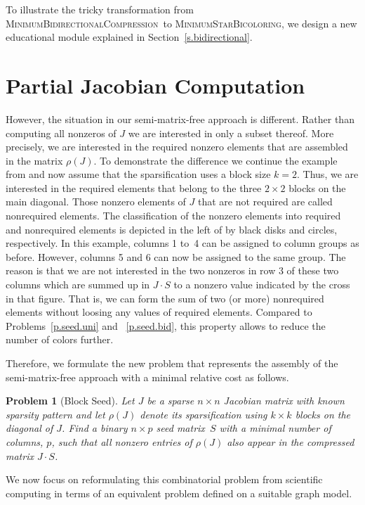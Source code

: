 \documentclass[12pt, oneside]{book}
\newtheorem{problem}{Problem}
\newcommand{\sparsifysymbol}{\ensuremath{\rho}}
\newcommand{\sparsify}[1]{\ensuremath{\sparsifysymbol(#1)}}
\newcommand{\MinStaBic}{\textsc{MinimumStarBicoloring}}
\newcommand{\MinBidCom}{\textsc{MinimumBidirectionalCompression}}
\begin{document}
To illustrate the tricky transformation from \MinBidCom\ to \MinStaBic, we design a new
educational module explained in Section~\ref{s.bidirectional}.

\section{Partial Jacobian Computation}
However, the situation in our semi-matrix-free approach is different. Rather than
computing all nonzeros of $J$ we are interested in only a subset thereof. More precisely,
we are interested in the required nonzero elements that are assembled in the matrix
\sparsify{J}. To demonstrate the difference we continue the example from 
and now assume that the sparsification uses a block size $k=2$. Thus, we are interested
in the required elements that belong to the three $2 \times 2$ blocks on the main
diagonal. Those nonzero elements of $J$ that are not required are called nonrequired
elements. The classification of the nonzero elements into required and nonrequired
elements is depicted in the left of 
by black disks and circles,
respectively. In this example, columns 1 to~4 can be assigned to column groups as before.
However, columns 5 and 6 can now be assigned to the same group. The reason is that we are
not interested in the two nonzeros in row 3 of these two columns which are summed up in
$J\cdot S$ to a nonzero value indicated by the cross in that figure. That is, we can form
the sum of two (or more) nonrequired elements without loosing any values of required
elements. Compared to Problems~\ref{p.seed.uni} and ~\ref{p.seed.bid}, 
this property allows to reduce the number of
colors further.

Therefore, we formulate the new problem that represents the assembly of the
semi-matrix-free approach with a minimal relative cost as follows.
%
\begin{problem}[Block Seed]
\label{p:block}
%
Let $J$ be a sparse $n \times n$ Jacobian matrix with known sparsity pattern and let
\sparsify{J} denote its sparsification using $k \times k$ blocks on the diagonal of $J$.
Find a binary $n \times p$ seed matrix~$S$ with a minimal number of columns, $p$, such
that all nonzero entries of \sparsify{J} also appear in the compressed matrix $J \cdot
S$.
\end{problem}

We now focus on reformulating this combinatorial problem from
scientific computing in terms of an equivalent problem defined on a suitable graph model.
\end{document}
